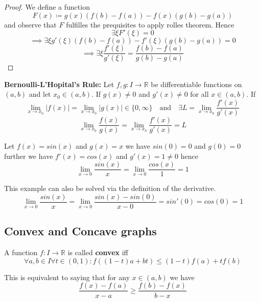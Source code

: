 \begin{proof}
    We define a function
    $$F(x) \coloneqq g(x)(f(b)-f(a)) - f(x)(g(b)-g(a))$$
    and observe that $F$ fulfilles the prequisites to apply rolles theorem. Hence 
    $$\exists \xi F'(\xi) = 0$$
    $$\implies \exists \xi g'(\xi)(f(b)-f(a)) - f'(\xi)(g(b)-g(a)) = 0$$
    $$\implies \exists \xi \frac{f'(\xi)}{g'(\xi)} = \frac{f(b)-f(a)}{g(b)-g(a)}$$
\end{proof}

\begin{theorem}
    \textbf{Bernoulli-L'Hopital's Rule:} Let $f, g: I \to \mathbb{R}$ be differentiable functions on $(a, b)$ and let $x_0 \in (a, b)$. If $g(x) \neq 0$ and $g'(x) \neq 0$ for all $x \in (a, b)$. If 
    $$\lim_{x \to x_0} |f(x)| = \lim_{x \to x_0} |g(x)| \in \{ 0, \infty \} \quad  \text{and} \quad \exists L = \lim_{x \to x_0} \frac{f'(x)}{g'(x)}$$
    $$\lim_{x \to x_0} \frac{f(x)}{g(x)} = \lim_{x \to x_0} \frac{f'(x)}{g'(x)} = L$$
\end{theorem}

\begin{example}
    Let $f(x) = sin(x)$ and $g(x) = x$ we have $sin(0) = 0$ and $g(0) = 0$ further we have $f'(x) = cos(x)$ and $g'(x) = 1 \neq 0$ hence 
    $$\lim_{x \to 0} \frac{sin(x)}{x} = \lim_{x \to 0} \frac{cos(x)}{1} = 1$$
\end{example}

\begin{remark}
    This example can also be solved via the definition of the derivative.
    $$\lim_{x \to 0} \frac{sin(x)}{x} = \lim_{x \to 0} \frac{sin(x)-sin(0)}{x-0} = sin'(0) = cos(0) = 1$$
\end{remark}

\subsection{Convex and Concave graphs}

\begin{definition}
    A function $f: I \to \mathbb{R}$ is called \textbf{convex} iff 
    $$\forall a, b \in I \forall t \in (0, 1) : f((1-t)a + bt) \leq (1-t) f(a) + t f(b)$$
\end{definition}

\begin{remark}
    This is equivalent to saying that for any $x \in (a, b)$ we have
    $$\frac{f(x)-f(a)}{x-a} \geq \frac{f(b)-f(x)}{b-x}$$
\end{remark}

